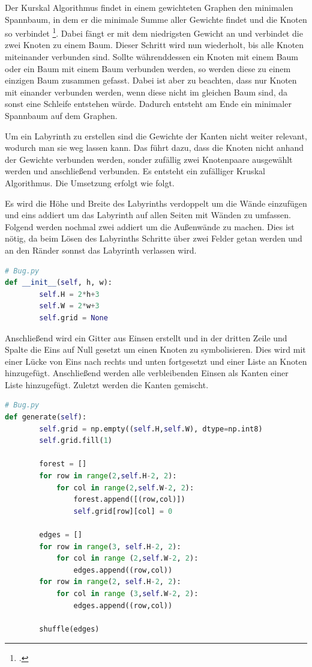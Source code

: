 \documentclass[12pt, a4paper, titlepage]{article}
\begin{document}
\bigskip

Der Kurskal Algorithmus findet in einem gewichteten Graphen den minimalen Spannbaum, in dem er die minimale Summe aller Gewichte findet und die Knoten so verbindet \footcite{maze}.
Dabei fängt er mit dem niedrigsten Gewicht an und verbindet die zwei Knoten zu einem Baum.
Dieser Schritt wird nun wiederholt, bis alle Knoten miteinander verbunden sind.
Sollte währenddessen ein Knoten mit einem Baum oder ein Baum mit einem Baum verbunden werden, so werden diese zu einem einzigen Baum zusammen gefasst.
Dabei ist aber zu beachten, dass nur Knoten mit einander verbunden werden, wenn diese nicht im gleichen Baum sind, da sonst eine Schleife entstehen würde.
Dadurch entsteht am Ende ein minimaler Spannbaum auf dem Graphen.
 

\bigskip

Um ein Labyrinth zu erstellen sind die Gewichte der Kanten nicht weiter relevant, wodurch man sie weg lassen kann.
Das führt dazu, dass die Knoten nicht anhand der Gewichte verbunden werden, sonder zufällig zwei Knotenpaare ausgewählt werden und anschließend verbunden.
Es entsteht ein zufälliger Kruskal Algorithmus.
Die Umsetzung erfolgt wie folgt.


Es wird die Höhe und Breite des Labyrinths verdoppelt um die Wände einzufügen und eins addiert um das Labyrinth auf allen Seiten mit Wänden zu umfassen.
Folgend werden nochmal zwei addiert um die Außenwände  zu machen. Dies ist nötig, da beim Lösen des Labyrinths Schritte über zwei Felder getan werden und an den Ränder sonnst das Labyrinth verlassen wird.
\begin{lstlisting}[language = Python]
# Bug.py
def __init__(self, h, w):
        self.H = 2*h+3
        self.W = 2*w+3
        self.grid = None
\end{lstlisting}

Anschließend wird ein Gitter aus Einsen erstellt und in der dritten Zeile und Spalte die Eins auf Null gesetzt um einen Knoten zu symbolisieren.
Dies wird mit einer Lücke von Eins nach rechts und unten fortgesetzt und einer Liste an Knoten hinzugefügt.
Anschließend werden alle verbleibenden Einsen als Kanten einer Liste hinzugefügt.
Zuletzt werden die Kanten gemischt.

\begin{lstlisting}[language = Python]
# Bug.py
def generate(self):
        self.grid = np.empty((self.H,self.W), dtype=np.int8)
        self.grid.fill(1)
        
        forest = []
        for row in range(2,self.H-2, 2):
            for col in range(2,self.W-2, 2):
                forest.append([(row,col)])
                self.grid[row][col] = 0
        
        edges = []
        for row in range(3, self.H-2, 2):
            for col in range (2,self.W-2, 2):
                edges.append((row,col))
        for row in range(2, self.H-2, 2):
            for col in range (3,self.W-2, 2):
                edges.append((row,col))
        
        shuffle(edges)
\end{lstlisting}
\end{document}
